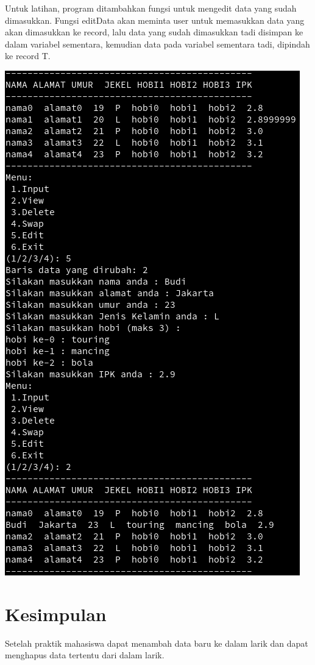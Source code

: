 \documentclass[a4paper,12pt]{article}
\begin{document}
Untuk latihan, program ditambahkan fungsi untuk mengedit data yang sudah dimasukkan.
Fungsi editData akan meminta user untuk memasukkan data yang akan dimasukkan ke record,
lalu data yang sudah dimasukkan tadi disimpan ke dalam variabel sementara, kemudian 
data pada variabel sementara tadi, dipindah ke record T.
\begin{center}
    \includegraphics[scale=.7]{tug.png} 
\end{center}

\newpage

\section{Kesimpulan}
Setelah praktik mahasiswa dapat menambah data baru ke dalam larik dan dapat menghapus data tertentu dari dalam larik.
\end{document}
